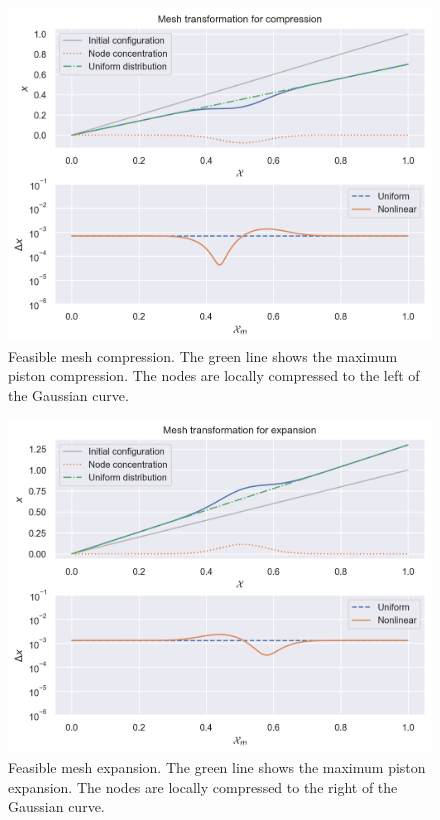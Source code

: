 \documentclass[../../thesis.tex]{subfiles}
\begin{document}
\begin{figure}[h]
    \includegraphics[width =\columnwidth]{research_project/piston/figures/nonlinear_displacement/separable/mapping_mu_05_sigma_01_p_05_compression.png}
    \caption{Feasible mesh compression. 
    The green line shows the maximum piston compression.
    The nodes are locally compressed to the left of the Gaussian curve.}
    \label{fig:mesh_disp_compression}
\end{figure}
\begin{figure}[h]
    \includegraphics[width =\columnwidth]{research_project/piston/figures/nonlinear_displacement/separable/mapping_mu_05_sigma_01_p_075_expansion.png}
    \caption{Feasible mesh expansion. 
    The green line shows the maximum piston expansion.
    The nodes are locally compressed to the right of the Gaussian curve.}
    \label{fig:mesh_disp_expansion}
\end{figure}
\end{document}
